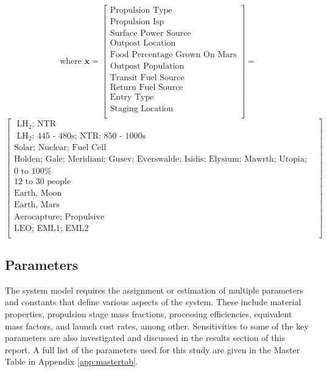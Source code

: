 \documentclass[]{aiaa-pretty}
\begin{document}
\begin{equation*}
\mbox{where } \mathbf{x}
=
\begin{bmatrix}
\mbox{Propulsion Type}\\
\mbox{Propulsion Isp}\\
\mbox{Surface Power Source}\\
\mbox{Outpost Location}\\
\mbox{Food Percentage Grown On Mars}\\
\mbox{Outpost Population}\\
\mbox{Transit Fuel Source}\\
\mbox{Return Fuel Source}\\
\mbox{Entry Type}\\
\mbox{Staging Location}\\
\end{bmatrix}
=
\end{equation*}
\begin{equation*}
\begin{bmatrix}
\mbox{ LH$_2$; NTR}\\
\mbox{ LH$_2$: 445 - 480s; NTR: 850 - 1000s}\\
\mbox{Solar; Nuclear; Fuel Cell}\\
\mbox{Holden; Gale; Meridiani; Gusev; Everswalde; Isidis; Elysium; Mawrth; Utopia; Planus Boreum; Hellas; Amazonis}\\
\mbox{0 to 100\%}\\
\mbox{12 to 30 people}\\
\mbox{Earth, Moon}\\
\mbox{Earth, Mars}\\
\mbox{Aerocapture; Propulsive}\\
\mbox{LEO; EML1; EML2}\\
\end{bmatrix}
\end{equation*}

\subsection{Parameters}
\label{sec:params}
The system model requires the assignment or estimation of multiple parameters and constants that define various aspects of the system. These include material properties, propulsion stage mass fractions, processing efficiencies, equivalent mass factors, and launch cost rates, among other. Sensitivities to some of the key parameters are also investigated and discussed in the results section of this report. A full list of the parameters used for this study are given in the Master Table in Appendix \ref{app:mastertab}. %
\end{document}
